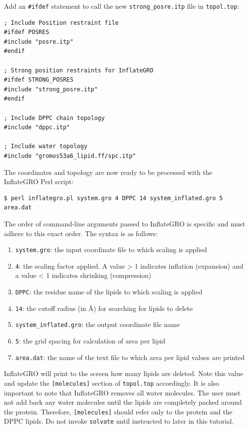 \documentclass[9pt,tutorial,pubversion]{livecoms}
\begin{document}
Add an \texttt{\#ifdef} statement to call the new \texttt{strong\_posre.itp} file in \texttt{topol.top}:

\begin{lstlisting}
; Include Position restraint file
#ifdef POSRES
#include "posre.itp"
#endif

; Strong position restraints for InflateGRO
#ifdef STRONG_POSRES
#include "strong_posre.itp"
#endif

; Include DPPC chain topology
#include "dppc.itp"

; Include water topology
#include "gromos53a6_lipid.ff/spc.itp"
\end{lstlisting}

The coordinates and topology are now ready to be processed with the InflateGRO Perl script:

\begin{lstlisting}
$ perl inflategro.pl system.gro 4 DPPC 14 system_inflated.gro 5 area.dat
\end{lstlisting}

The order of command-line arguments passed to InflateGRO is specific and must adhere to this exact order. The syntax is as follows:

\begin{enumerate}
	\item{\texttt{system.gro}: the input coordinate file to which scaling is applied}
	\item{\texttt{4}: the scaling factor applied. A value > 1 indicates inflation (expansion) and a value < 1 indicates shrinking (compression)}
	\item{\texttt{DPPC}: the residue name of the lipids to which scaling is applied}
	\item{\texttt{14}: the cutoff radius (in \AA) for searching for lipids to delete}
	\item{\texttt{system\_inflated.gro}: the output coordinate file name}
	\item{\texttt{5}: the grid spacing for calculation of area per lipid}
	\item{\texttt{area.dat}: the name of the text file to which area per lipid values are printed}
\end{enumerate}

InflateGRO will print to the screen how many lipids are deleted. Note this value and update the \texttt{[molecules]} section of \texttt{topol.top} accordingly. It is also important to note that InflateGRO removes all water molecules. The user must not add back any water molecules until the lipids are completely packed around the protein. Therefore, \texttt{[molecules]} should refer only to the protein and the DPPC lipids. Do not invoke \texttt{solvate} until instructed to later in this tutorial.
\end{document}
